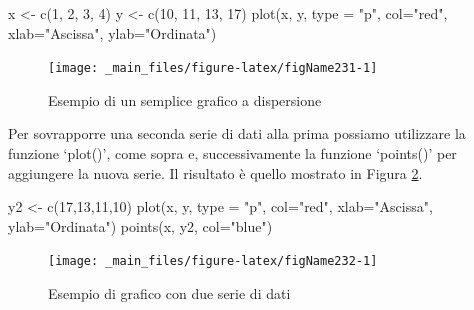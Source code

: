 \documentclass[a4paper,12pt,oneside]{book}
\newenvironment{Shaded}{\begin{snugshade}}{\end{snugshade}}
\newcommand{\DecValTok}[1]{#1}
\newcommand{\StringTok}[1]{#1}
\newcommand{\OtherTok}[1]{#1}
\newcommand{\FunctionTok}[1]{#1}
\newcommand{\AttributeTok}[1]{#1}
\newcommand{\NormalTok}[1]{#1}
\begin{document}
\begin{Shaded}
\begin{Highlighting}[]
\NormalTok{x  }\OtherTok{\textless{}{-}}  \FunctionTok{c}\NormalTok{(}\DecValTok{1}\NormalTok{, }\DecValTok{2}\NormalTok{, }\DecValTok{3}\NormalTok{, }\DecValTok{4}\NormalTok{)}
\NormalTok{y  }\OtherTok{\textless{}{-}}  \FunctionTok{c}\NormalTok{(}\DecValTok{10}\NormalTok{, }\DecValTok{11}\NormalTok{, }\DecValTok{13}\NormalTok{, }\DecValTok{17}\NormalTok{)}
\FunctionTok{plot}\NormalTok{(x, y, }\AttributeTok{type =} \StringTok{"p"}\NormalTok{, }\AttributeTok{col=}\StringTok{"red"}\NormalTok{, }\AttributeTok{xlab=}\StringTok{"Ascissa"}\NormalTok{, }\AttributeTok{ylab=}\StringTok{"Ordinata"}\NormalTok{)}
\end{Highlighting}
\end{Shaded}

\begin{figure}

{\centering \texttt{[image: \_main\_files/figure-latex/figName231-1]} 

}

\caption{Esempio di un semplice grafico a dispersione}\label{fig:figName231}
\end{figure}

Per sovrapporre una seconda serie di dati alla prima possiamo utilizzare la funzione `plot()', come sopra e, successivamente la funzione `points()' per aggiungere la nuova serie. Il risultato è quello mostrato in Figura \ref{fig:figName232}.

\begin{Shaded}
\begin{Highlighting}[]
\NormalTok{y2  }\OtherTok{\textless{}{-}}  \FunctionTok{c}\NormalTok{(}\DecValTok{17}\NormalTok{,}\DecValTok{13}\NormalTok{,}\DecValTok{11}\NormalTok{,}\DecValTok{10}\NormalTok{)}
\FunctionTok{plot}\NormalTok{(x, y, }\AttributeTok{type =} \StringTok{"p"}\NormalTok{, }\AttributeTok{col=}\StringTok{"red"}\NormalTok{, }\AttributeTok{xlab=}\StringTok{"Ascissa"}\NormalTok{, }\AttributeTok{ylab=}\StringTok{"Ordinata"}\NormalTok{)}
\FunctionTok{points}\NormalTok{(x, y2, }\AttributeTok{col=}\StringTok{"blue"}\NormalTok{)}
\end{Highlighting}
\end{Shaded}

\begin{figure}

{\centering \texttt{[image: \_main\_files/figure-latex/figName232-1]} 

}

\caption{Esempio di grafico con due serie di dati}\label{fig:figName232}
\end{figure}
\end{document}
